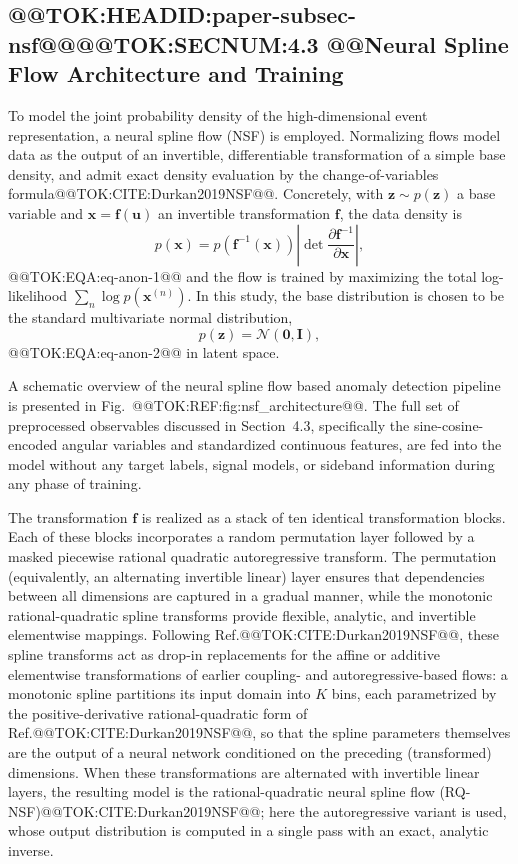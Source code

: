 \documentclass[11pt]{article}
\begin{document}
\subsection{@@TOK:HEADID:paper-subsec-nsf@@@@TOK:SECNUM:4.3 @@Neural Spline Flow Architecture and Training}

To model the joint probability density of the high-dimensional event representation, a neural spline flow (NSF) is employed. Normalizing flows model data as the output of an invertible, differentiable transformation of a simple base density, and admit exact density evaluation by the change-of-variables formula@@TOK:CITE:Durkan2019NSF@@. Concretely, with $\mathbf{z}\sim p(\mathbf{z})$ a base variable and $\mathbf{x}=\mathbf{f}(\mathbf{u})$ an invertible transformation $\mathbf{f}$, the data density is
\begin{equation}
p(\mathbf{x}) = p\!\left(\mathbf{f}^{-1}(\mathbf{x})\right)\left|\det\frac{\partial \mathbf{f}^{-1}}{\partial \mathbf{x}}\right|,
\end{equation}@@TOK:EQA:eq-anon-1@@
and the flow is trained by maximizing the total log-likelihood $\sum_n \log p(\mathbf{x}^{(n)})$. In this study, the base distribution is chosen to be the standard multivariate normal distribution,
\begin{equation}
p(\mathbf{z}) = \mathcal{N}(\mathbf{0}, \mathbf{I}),
\end{equation}@@TOK:EQA:eq-anon-2@@
in latent space.

A schematic overview of the neural spline flow based anomaly detection pipeline is presented in Fig.~@@TOK:REF:fig:nsf_architecture@@. The full set of preprocessed observables discussed in Section~4.3, specifically the sine-cosine-encoded angular variables and standardized continuous features, are fed into the model without any target labels, signal models, or sideband information during any phase of training.

The transformation $\mathbf{f}$ is realized as a stack of ten identical transformation blocks. Each of these blocks incorporates a random permutation layer followed by a masked piecewise rational quadratic autoregressive transform. The permutation (equivalently, an alternating invertible linear) layer ensures that dependencies between all dimensions are captured in a gradual manner, while the monotonic rational-quadratic spline transforms provide flexible, analytic, and invertible elementwise mappings. Following Ref.@@TOK:CITE:Durkan2019NSF@@, these spline transforms act as drop-in replacements for the affine or additive elementwise transformations of earlier coupling- and autoregressive-based flows: a monotonic spline partitions its input domain into $K$ bins, each parametrized by the positive-derivative rational-quadratic form of Ref.@@TOK:CITE:Durkan2019NSF@@, so that the spline parameters themselves are the output of a neural network conditioned on the preceding (transformed) dimensions. When these transformations are alternated with invertible linear layers, the resulting model is the rational-quadratic neural spline flow (RQ-NSF)@@TOK:CITE:Durkan2019NSF@@; here the autoregressive variant is used, whose output distribution is computed in a single pass with an exact, analytic inverse.
\end{document}
